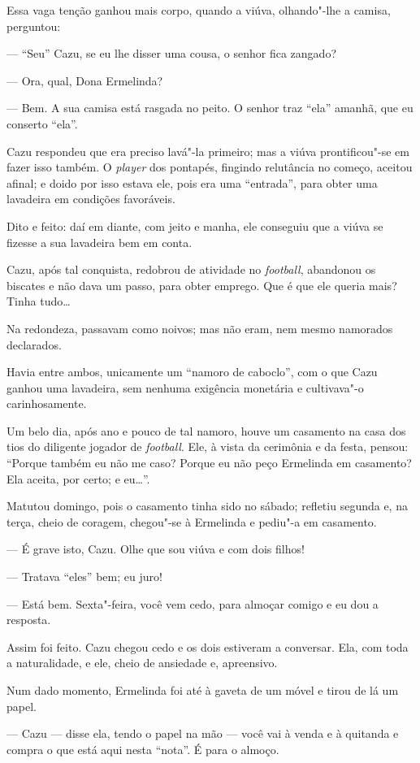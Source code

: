 Essa vaga tenção ganhou mais corpo, quando a viúva, olhando"-lhe a
camisa, perguntou:

--- ``Seu'' Cazu, se eu lhe disser uma cousa, o senhor fica zangado?

--- Ora, qual, Dona Ermelinda?

--- Bem. A sua camisa está rasgada no peito. O senhor traz ``ela''
amanhã, que eu conserto ``ela''.

Cazu respondeu que era preciso lavá"-la primeiro; mas a viúva
prontificou"-se em fazer isso também. O \emph{player} dos pontapés,
fingindo relutância no começo, aceitou afinal; e doido por isso estava
ele, pois era uma ``entrada'', para obter uma lavadeira em condições
favoráveis.

Dito e feito: daí em diante, com jeito e manha, ele conseguiu que a
viúva se fizesse a sua lavadeira bem em conta.

Cazu, após tal conquista, redobrou de atividade no \emph{football},
abandonou os biscates e não dava um passo, para obter emprego. Que é que
ele queria mais? Tinha tudo\ldots{}

Na redondeza, passavam como noivos; mas não eram, nem mesmo namorados
declarados.

Havia entre ambos, unicamente um ``namoro de caboclo'', com o que Cazu
ganhou uma lavadeira, sem nenhuma exigência monetária e cultivava"-o
carinhosamente.

Um belo dia, após ano e pouco de tal namoro, houve um casamento na casa
dos tios do diligente jogador de \emph{football}. Ele, à vista da
cerimônia e da festa, pensou: ``Porque também eu não me caso? Porque eu
não peço Ermelinda em casamento? Ela aceita, por certo; e eu\ldots{}''.

Matutou domingo, pois o casamento tinha sido no sábado; refletiu segunda
e, na terça, cheio de coragem, chegou"-se à Ermelinda e pediu"-a em
casamento.

--- É grave isto, Cazu. Olhe que sou viúva e com dois filhos!

--- Tratava ``eles'' bem; eu juro!

--- Está bem. Sexta"-feira, você vem cedo, para almoçar comigo e eu dou a
resposta.

Assim foi feito. Cazu chegou cedo e os dois estiveram a conversar. Ela,
com toda a naturalidade, e ele, cheio de ansiedade e, apreensivo.

Num dado momento, Ermelinda foi até à gaveta de um móvel e tirou de lá
um papel.

--- Cazu --- disse ela, tendo o papel na mão --- você vai à venda e à
quitanda e compra o que está aqui nesta ``nota''. É para o almoço.

